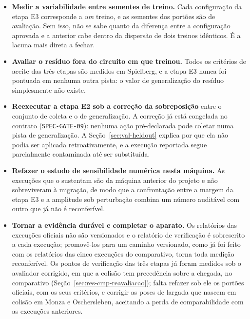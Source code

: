\begin{itemize}
    \item \textbf{Medir a variabilidade entre sementes de treino.} Cada
          configuração da etapa E3 corresponde a \textit{um} treino, e as
          sementes dos portões são de avaliação. Sem isso, não se sabe quanto da
          diferença entre a configuração aprovada e a anterior cabe dentro da
          dispersão de dois treinos idênticos. É a lacuna mais direta a fechar.
    \item \textbf{Avaliar o resíduo fora do circuito em que treinou.} Todos os
          critérios de aceite das três etapas são medidos em Spielberg, e a etapa
          E3 nunca foi pontuada em nenhuma outra pista: o valor de generalização
          do resíduo simplesmente não existe.
    \item \textbf{Reexecutar a etapa E2 sob a correção da sobreposição} entre o
          conjunto de coleta e o de generalização. A correção já está congelada
          no contrato (\texttt{SPEC-GATE-09}): nenhuma ação pré-declarada pode
          coletar numa pista de generalização. A
          Seção~\ref{sec:val-heldout} explica por que ela não podia ser
          aplicada retroativamente, e a execução reportada segue parcialmente
          contaminada até ser substituída.
    \item \textbf{Refazer o estudo de sensibilidade numérica nesta máquina.} As
          execuções que o sustentam são da máquina anterior do projeto e não
          sobreviveram à migração, de modo que a confrontação entre a margem da
          etapa E3 e a amplitude sob perturbação combina um número auditável com
          outro que já não é reconferível.
    \item \textbf{Tornar a evidência durável e completar o aparato.} Os
          relatórios das execuções oficiais não são versionados e o relatório
          de verificação é sobrescrito a cada execução; promovê-los para um
          caminho versionado, como já foi feito com os relatórios das cinco
          execuções do comparativo, torna toda medição reconferível. Os pontos
          de verificação das três etapas já foram medidos sob o avaliador
          corrigido, em que a colisão tem precedência sobre a chegada, no
          comparativo (Seção~\ref{sec:res-cmp-reavaliacao}); falta refazer sob
          ele os portões oficiais, com os seus critérios, e corrigir as poses de
          largada que nascem em colisão em Monza e Oschersleben, aceitando a
          perda de comparabilidade com as execuções anteriores.
\end{itemize}

